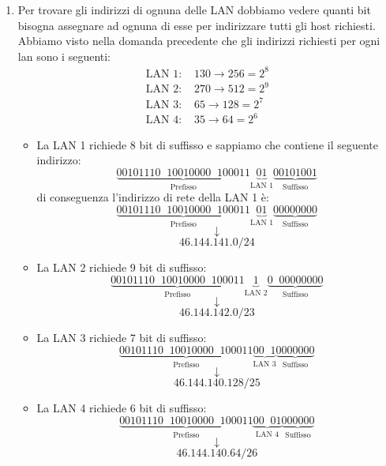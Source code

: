 \documentclass[a4paper]{article}
\begin{document}
\begin{enumerate}
  \item Per trovare gli indirizzi di ognuna delle LAN dobbiamo vedere quanti bit bisogna
    assegnare ad ognuna di esse per indirizzare tutti gli host richiesti. Abbiamo visto
    nella domanda precedente che gli indirizzi richiesti per ogni lan sono i seguenti:
    \[
      \begin{aligned}
        \text{LAN 1: } & 130 \to 256 = 2^8\\
        \text{LAN 2: } & 270 \to 512 = 2^9\\
        \text{LAN 3: } & 65 \to 128 = 2^7\\
        \text{LAN 4: } & 35 \to 64 = 2^6
      \end{aligned}
    \] 
    \begin{itemize}
      \item La LAN 1 richiede 8 bit di suffisso e sappiamo che contiene il seguente
        indirizzo:
        \[
          \underbrace{00101110 \;\; 10010000 \;\; 100011}_{\text{Prefisso}}
          \underbrace{01}_{\text{LAN 1}}
          \underbrace{00101001}_{\text{Suffisso}}
        \] 
        di conseguenza l'indirizzo di rete della LAN 1 è:
        \[
          \underbrace{00101110 \;\; 10010000 \;\; 100011}_{\text{Prefisso}}
          \underbrace{01}_{\text{LAN 1}}
          \underbrace{00000000}_{\text{Suffisso}}
        \] 
        \[
          \downarrow
        \] 
        \[
          46.144.141.0/24
        \] 
      \item La LAN 2 richiede 9 bit di suffisso:
        \[
          \underbrace{00101110 \;\; 10010000 \;\; 100011}_{\text{Prefisso}}
          \underbrace{1}_{\text{LAN 2}}
          \underbrace{0 \;\; 00000000}_{\text{Suffisso}}
        \] 
        \[
          \downarrow
        \] 
        \[
          46.144.142.0/23
        \] 
      \item La LAN 3 richiede 7 bit di suffisso:
        \[
          \underbrace{00101110 \;\; 10010000 \;\; 100011}_{\text{Prefisso}}
          \underbrace{00 \;\; 1}_{\text{LAN 3}}
          \underbrace{0000000}_{\text{Suffisso}}
        \] 
        \[
          \downarrow
        \] 
        \[
          46.144.140.128/25
        \] 
      \item La LAN 4 richiede 6 bit di suffisso:
        \[
          \underbrace{00101110 \;\; 10010000 \;\; 100011}_{\text{Prefisso}}
          \underbrace{00 \;\; 01}_{\text{LAN 4}}
          \underbrace{000000}_{\text{Suffisso}}
        \] 
        \[
          \downarrow
        \] 
        \[
          46.144.140.64/26
        \] 
    \end{itemize}
\end{enumerate}
\end{document}
